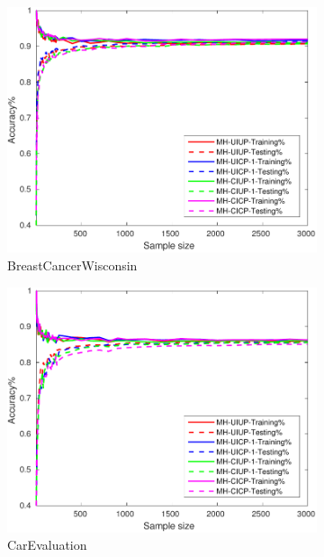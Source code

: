 \begin{figure}[ht]
  \begin{subfigure}[b]{0.3\textwidth}
		\centering
		\includegraphics[width=\textwidth]{figs/PLPTF/Trees/BreastCancerWisconsinDownsampled_Trees_MH.pdf}
		\caption{BreastCancerWisconsin}
		\label{fig:B2}
	\end{subfigure}
  \begin{subfigure}[b]{0.3\textwidth}
		\centering
  	\includegraphics[width=\textwidth]{figs/PLPTF/Trees/CarEvaluation_Trees_MH.pdf}
  	\caption{CarEvaluation}
		\label{fig:Car2}
	\end{subfigure}
  \begin{subfigure}[b]{0.3\textwidth}

\end{subfigure}
\end{figure}
